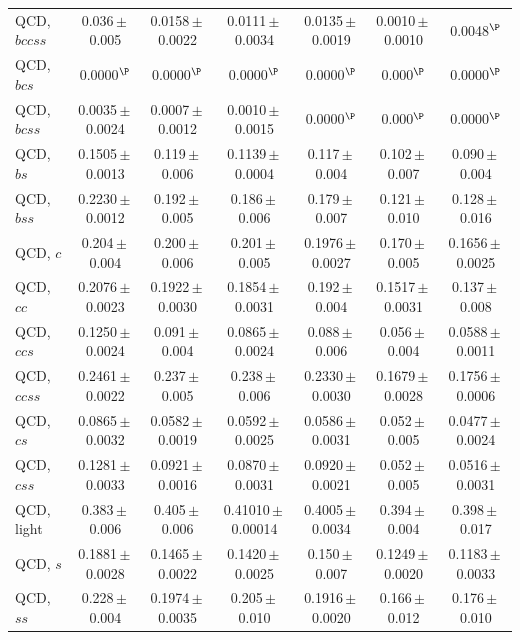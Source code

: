 \documentclass[12pt]{article}   %
\begin{document}
\begin{landscape}
{\begin{longtable}{@{\extracolsep{\fill}}lcccccc@{}}
QCD, $bccss$ & 0.036\,$\pm$\,0.005 & 0.0158\,$\pm$\,0.0022 & 0.0111\,$\pm$\,0.0034 & 0.0135\,$\pm$\,0.0019 & 0.0010\,$\pm$\,0.0010 & 0.0048$^{\P}$ \\
QCD, $bcs$ & 0.0000$^{\P}$ & 0.0000$^{\P}$ & 0.0000$^{\P}$ & 0.0000$^{\P}$ & 0.000$^{\P}$ & 0.0000$^{\P}$ \\
QCD, $bcss$ & 0.0035\,$\pm$\,0.0024 & 0.0007\,$\pm$\,0.0012 & 0.0010\,$\pm$\,0.0015 & 0.0000$^{\P}$ & 0.000$^{\P}$ & 0.0000$^{\P}$ \\
QCD, $bs$ & 0.1505\,$\pm$\,0.0013 & 0.119\,$\pm$\,0.006 & 0.1139\,$\pm$\,0.0004 & 0.117\,$\pm$\,0.004 & 0.102\,$\pm$\,0.007 & 0.090\,$\pm$\,0.004 \\
QCD, $bss$ & 0.2230\,$\pm$\,0.0012 & 0.192\,$\pm$\,0.005 & 0.186\,$\pm$\,0.006 & 0.179\,$\pm$\,0.007 & 0.121\,$\pm$\,0.010 & 0.128\,$\pm$\,0.016 \\
QCD, $c$ & 0.204\,$\pm$\,0.004 & 0.200\,$\pm$\,0.006 & 0.201\,$\pm$\,0.005 & 0.1976\,$\pm$\,0.0027 & 0.170\,$\pm$\,0.005 & 0.1656\,$\pm$\,0.0025 \\
QCD, $cc$ & 0.2076\,$\pm$\,0.0023 & 0.1922\,$\pm$\,0.0030 & 0.1854\,$\pm$\,0.0031 & 0.192\,$\pm$\,0.004 & 0.1517\,$\pm$\,0.0031 & 0.137\,$\pm$\,0.008 \\
QCD, $ccs$ & 0.1250\,$\pm$\,0.0024 & 0.091\,$\pm$\,0.004 & 0.0865\,$\pm$\,0.0024 & 0.088\,$\pm$\,0.006 & 0.056\,$\pm$\,0.004 & 0.0588\,$\pm$\,0.0011 \\
QCD, $ccss$ & 0.2461\,$\pm$\,0.0022 & 0.237\,$\pm$\,0.005 & 0.238\,$\pm$\,0.006 & 0.2330\,$\pm$\,0.0030 & 0.1679\,$\pm$\,0.0028 & 0.1756\,$\pm$\,0.0006 \\
QCD, $cs$ & 0.0865\,$\pm$\,0.0032 & 0.0582\,$\pm$\,0.0019 & 0.0592\,$\pm$\,0.0025 & 0.0586\,$\pm$\,0.0031 & 0.052\,$\pm$\,0.005 & 0.0477\,$\pm$\,0.0024 \\
QCD, $css$ & 0.1281\,$\pm$\,0.0033 & 0.0921\,$\pm$\,0.0016 & 0.0870\,$\pm$\,0.0031 & 0.0920\,$\pm$\,0.0021 & 0.052\,$\pm$\,0.005 & 0.0516\,$\pm$\,0.0031 \\
QCD, light & 0.383\,$\pm$\,0.006 & 0.405\,$\pm$\,0.006 & 0.41010\,$\pm$\,0.00014 & 0.4005\,$\pm$\,0.0034 & 0.394\,$\pm$\,0.004 & 0.398\,$\pm$\,0.017 \\
QCD, $s$ & 0.1881\,$\pm$\,0.0028 & 0.1465\,$\pm$\,0.0022 & 0.1420\,$\pm$\,0.0025 & 0.150\,$\pm$\,0.007 & 0.1249\,$\pm$\,0.0020 & 0.1183\,$\pm$\,0.0033 \\
QCD, $ss$ & 0.228\,$\pm$\,0.004 & 0.1974\,$\pm$\,0.0035 & 0.205\,$\pm$\,0.010 & 0.1916\,$\pm$\,0.0020 & 0.166\,$\pm$\,0.012 & 0.176\,$\pm$\,0.010 \\

\end{longtable}}
\end{landscape}
\end{document}
